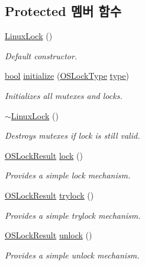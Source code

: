 \subsection*{Protected 멤버 함수}
\begin{DoxyCompactItemize}
\item 
\hyperlink{class_linux_lock_a15744f2c866826d4b18ff5e934c0a326}{Linux\+Lock} ()
\begin{DoxyCompactList}\small\item\em Default constructor. \end{DoxyCompactList}\item 
\hyperlink{avb__gptp_8h_af6a258d8f3ee5206d682d799316314b1}{bool} \hyperlink{class_linux_lock_abe9590069aa14b3a011b299110c7d50f}{initialize} (\hyperlink{avbts__oslock_8hpp_a88e6fcd587e202a0bf3d0318d8fff8bb}{O\+S\+Lock\+Type} \hyperlink{class_linux_lock_aeab5ee1f363ea475ef801f98a1da7838}{type})
\begin{DoxyCompactList}\small\item\em Initializes all mutexes and locks. \end{DoxyCompactList}\item 
\hyperlink{class_linux_lock_a8402cb7e5c3f4f4b60eef75cd42404d9}{$\sim$\+Linux\+Lock} ()
\begin{DoxyCompactList}\small\item\em Destroys mutexes if lock is still valid. \end{DoxyCompactList}\item 
\hyperlink{avbts__oslock_8hpp_a6ade377184a937ebffbe2a94b7369a64}{O\+S\+Lock\+Result} \hyperlink{class_linux_lock_aefc4b18353917a86c322d3831c882c09}{lock} ()
\begin{DoxyCompactList}\small\item\em Provides a simple lock mechanism. \end{DoxyCompactList}\item 
\hyperlink{avbts__oslock_8hpp_a6ade377184a937ebffbe2a94b7369a64}{O\+S\+Lock\+Result} \hyperlink{class_linux_lock_a098e16631cf8124ba7d5b0c8bacaddef}{trylock} ()
\begin{DoxyCompactList}\small\item\em Provides a simple trylock mechanism. \end{DoxyCompactList}\item 
\hyperlink{avbts__oslock_8hpp_a6ade377184a937ebffbe2a94b7369a64}{O\+S\+Lock\+Result} \hyperlink{class_linux_lock_ad76539cc13c8522878b489db1fb1d2f1}{unlock} ()
\begin{DoxyCompactList}\small\item\em Provides a simple unlock mechanism. \end{DoxyCompactList}\end{DoxyCompactItemize}
